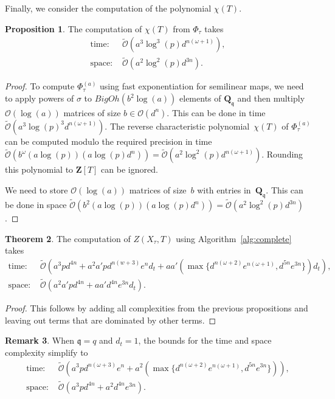 \documentclass[a4paper,11pt]{article}
\numberwithin{equation}{section}
\newcommand{\ZZ}{\mathbf{Z}} %
\newcommand{\QQ}{\mathbf{Q}} %
\providecommand{\BigOh}{\mathcal{O}}          %
\providecommand{\SoftOh}{\tilde{\mathcal{O}}} %
\theoremstyle{definition}
\newtheorem{thm}{Theorem}[section]
\newtheorem{prop}[thm]{Proposition}
\newtheorem{rem}[thm]{Remark}
\begin{document}
Finally, we consider the computation of the polynomial $\chi(T)$.

\begin{prop}
The computation of $\chi(T)$ from $\Phi_{\tau}$ takes
\begin{align*}
\mbox{time: }  & \SoftOh(a^3 \log^3(p) d^{n(\omega+1)}), \\
\mbox{space: } & \SoftOh(a^2 \log^2(p) d^{3n}).
\end{align*}
\end{prop}

\begin{proof}
To compute $\Phi_{\tau}^{(a)}$ using fast exponentiation for 
semilinear maps, we need to apply powers of $\sigma$ to $BigOh(b^2 \log(a))$
elements of $\QQ_{\mathfrak{q}}$ and then multiply $\BigOh(\log(a))$ matrices 
of size $b \in \BigOh(d^n)$. This can be done in time 
$\SoftOh(a^3 \log(p)^3 d^{n(\omega+1)})$. The reverse characteristic 
polynomial~$\chi(T)$ of $\Phi_{\tau}^{(a)}$ can be computed modulo the 
required precision in time 
$\SoftOh(b^{\omega} (a \log(p))(a \log(p) d^n)) = \SoftOh(a^2 \log^2(p) d^{n(\omega+1)})$. 
Rounding this polynomial to $\ZZ[T]$ can be ignored.

We need to store $\BigOh(\log(a))$ matrices of size~$b$ with entries 
in~$\QQ_{\mathfrak{q}}$. This can be done in space 
$\SoftOh(b^2 (a \log(p))(a \log(p) d^n)) = \SoftOh(a^2 \log^2(p) d^{3n})$.
\end{proof}

\begin{thm}
The computation of $Z(X_{\tau},T)$ using Algorithm~\ref{alg:complete} takes
\begin{align*}
\mbox{time: }  &\SoftOh(a^3 p d^{4n} + a^2 a' p d^{n(w+3)} e^n d_t+ a a' (\max \{ d^{n(\omega+2)} e^{n(\omega+1)}, d^{5n}e^{3n} \}) d_t), \\
\mbox{space: } &\SoftOh(a^2 a' p d^{4n}+a a' d^{4n} e^{3n} d_t).
\end{align*}
\end{thm}

\begin{proof}
This follows by adding all complexities from the previous propositions and 
leaving out terms that are dominated by other terms.
\end{proof}

\begin{rem}
When $\mathfrak{q}=q$ and $d_t=1$, the bounds for the time and space 
complexity simplify to
\begin{align*}
\mbox{time: }  & \SoftOh(a^3 p d^{n( \omega+3 )} e^n + a^2 ( \max \{ d^{n( \omega+2 )} e^{n(\omega+1 )}, d^{5n}e^{3n} \} )), \\
\mbox{space: } &\SoftOh(a^3 p d^{4n}+a^2 d^{4n} e^{3n}).
\end{align*}
\end{rem}
\end{document}
